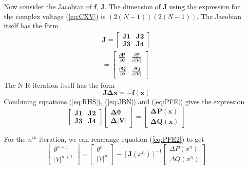 \documentclass[12pt]{article}
\begin{document}
Now consider the Jacobian of $\mathbf{f}$, $\mathbf{J}$. The dimension of
$\mathbf{J}$ using the expression for the complex voltage (\ref{eq:CXV}) is
$(2(N-1))(2(N-1))$. The Jacobian itself has the form
\begin{eqnarray}
\mathbf{J}  = \left [ \begin{array}{cc} \mathbf{J1} & \mathbf{J2} \\ \mathbf{J3} & \mathbf{J4} \end{array} \right ] \nonumber \\
\label{eq:JBN}
            = \left [ \begin{array}{cc} \frac{\partial \mathbf{P}}{\partial \boldsymbol{\theta}} & \frac{\partial \mathbf{P}}{\partial \mathbf{|V|}} \\ \frac{\partial \mathbf{Q}}{\partial \boldsymbol{\theta}} & \frac{\partial \mathbf{Q}}{\partial \mathbf{|V|}}  \end{array} \right ]
\end{eqnarray}
The N-R iteration itself has the form
\begin{equation}\label{eq:PFE}
\mathbf{J}\mathbf{\Delta x} = - \mathbf{f} \left ( \mathbf{x} \right )
\end{equation}
Combining equations (\ref{eq:RHS}), (\ref{eq:JBN}) and (\ref{eq:PFE}) gives the
expression
\begin{equation}\label{eq:PFE2}
\left [ \begin{array}{cc} \mathbf{J1} & \mathbf{J2} \\ \mathbf{J3} & \mathbf{J4} \end{array} \right ] \left [ \begin{array}{c} \mathbf{\Delta \theta} \\ \mathbf{\Delta |V|} \end{array} \right ] =  \left [ \begin{array}{c} \mathbf{\Delta P} \left (\mathbf{x} \right ) \\  \mathbf{\Delta Q} \left (\mathbf{x} \right ) \end{array} \right ]
\end{equation}

For the $n^{th}$ iteration, we can rearrange equation (\ref{eq:PFE2}) to get
\begin{equation}\label{eq:update}
\left [ \begin{array}{c} \theta^{n+1} \\ |V|^{n+1} \end{array} \right ] = \left [ \begin{array}{c} \theta^{n} \\ |V|^{n} \end{array} \right ] -  \left [ \mathbf{J} \left ( x^{n} \right ) \right] ^{-1}  \left [ \begin{array}{c} \Delta P\left ( x^{n} \right ) \\  \Delta Q\left ( x^{n} \right )  \end{array} \right ] 
\end{equation}
\end{document}
